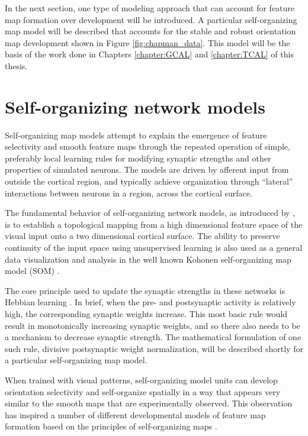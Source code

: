 \documentclass[phd,ianc,twoside]{infthesis}
\begin{document}
In the next section, one type of modeling approach that can account for
feature map formation over development will be introduced. A particular
self-organizing map model will be described that accounts for the stable
and robust orientation map development shown in Figure
\ref{fig:chapman_data}. This model will be the basis of the work done in
Chapters \ref{chapter:GCAL} and \ref{chapter:TCAL} of this thesis.


\section{Self-organizing network models}
\label{section:self_organizing_networks}

Self-organizing map models attempt to explain the emergence of feature
selectivity and smooth feature maps through the repeated operation of
simple, preferably local learning rules for modifying synaptic
strengths and other properties of simulated neurons.  The models
are driven by afferent input from outside the cortical region, and
typically achieve organization through ``lateral'' interactions
between neurons in a region, across the cortical surface.

The fundamental behavior of self-organizing network models, as
introduced by \citet{malsburg_kyber73}, is to establish a topological
mapping from a high dimensional feature space of the visual input onto a
two dimensional cortical surface. The ability to preserve continuity of
the input space using unsupervised learning is also used as a general
data visualization and analysis in the well known Kohonen
self-organizing map model (SOM) \citep{kohonen_biocyber82}.

The core principle used to update the synaptic strengths in these
networks is Hebbian learning \citep{hebb_book49}. In brief, when the
pre- and postsynaptic activity is relatively high, the corresponding
synaptic weights increase. This most basic rule would result in
monotonically increasing synaptic weights, and so there also needs
to be a mechanism to decrease synaptic strength. The mathematical
formulation of one such rule, divisive postsynaptic weight
normalization, will be described shortly for a particular
self-organizing map model.

When trained with visual patterns, self-organizing model units can develop
orientation selectivity and self-organize spatially in a way that
appears very similar to the smooth maps that are experimentally
observed. This observation has inspired a number of different developmental
models of feature map formation based on the principles of
self-organizing maps \citep{obermayer_pnas90,miikkulainen_2005}.
\end{document}
